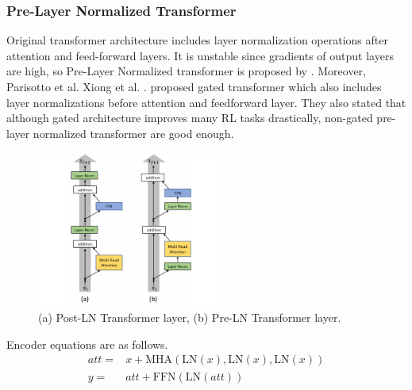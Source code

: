 \subsubsection{Pre-Layer Normalized Transformer}
Original transformer architecture includes layer normalization operations after attention and feed-forward layers. It is unstable since gradients of output layers are high, so Pre-Layer Normalized transformer is proposed by \cite{xiong_layer_2020}. Moreover,  Parisotto et al. Xiong et al. \cite{parisotto_stabilizing_2019}. proposed gated transformer which also includes layer normalizations before attention and feedforward layer. They also stated that although gated architecture improves many RL tasks drastically, non-gated pre-layer normalized transformer are good enough. \\
\begin{figure}
	\centering
	\includegraphics[width=0.55\textwidth]{figures/ml_theory/post_pre_trsf.png}
	\caption{(a) Post-LN Transformer layer, (b) Pre-LN Transformer
		layer.}
	\label{fig:post_pre_trsf}
\end{figure}
Encoder equations are as follows.\\
\begin{equation}
\begin{split}
att = & x+ \mathrm{MHA}(\mathrm{LN}(x),\mathrm{LN}(x),\mathrm{LN}(x)) \\
y = & att+ \mathrm{FFN}(\mathrm{LN}(att))
\end{split}
\end{equation}

